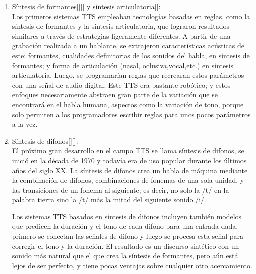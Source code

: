 \begin{enumerate}
	\item  Síntesis de formantes[\cite{tordera2011linguistica}][\cite{rodriguez2013sintetizador}] y síntesis articulatoria[\cite{hernandez2018sintesis}]: \\Los primeros sistemas TTS empleaban tecnologías basadas en reglas, como la síntesis de formantes y la síntesis articulatoria, que lograron resultados similares a través de estrategias ligeramente diferentes. A partir de una grabación realizada a un hablante, se extrajeron características acústicas de este: formantes, cualidades definitorias de los sonidos del habla, en síntesis de formantes; y forma de articulación (nasal, oclusiva,vocal,etc.) en síntesis articulatoria. Luego, se programarían reglas que recrearan estos parámetros con una señal de audio digital. Este TTS era bastante robótico; y estos enfoques necesariamente abstraen gran parte de la variación que se encontrará en el habla humana, aspectos como la variación de tono, porque solo permiten a los programadores escribir reglas para unos pocos parámetros a la vez.
	
	\item Síntesis de difonos[\cite{beutnagel1998diphone}][\cite{al2009arabic}]: \\ El próximo gran desarrollo en el campo TTS se llama síntesis de difonos, se inició en la década de 1970 y todavía era de uso popular durante los últimos años del siglo XX. La síntesis de difonos crea  un habla de máquina mediante la combinación de difonos, combinaciones de fonemas de una sola unidad, y las transiciones de un fonema al siguiente; es decir, no solo la /t/ en la palabra tierra sino la /t/ más la mitad del siguiente sonido /i/. 
	
	Los sistemas TTS basados en síntesis de difonos incluyen también modelos que predicen la duración y el tono de cada difono para una entrada dada, primero se conectan las señales de difono y luego se procesa esta señal para corregir el tono y la duración. El resultado es un discurso  sintético con un sonido más natural que el que crea la síntesis de formantes, pero aún está lejos de ser perfecto, y tiene pocas ventajas sobre cualquier otro acercamiento. 
	

\end{enumerate}
